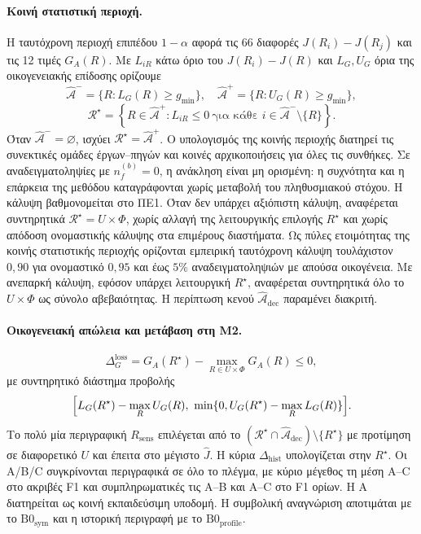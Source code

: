 \documentclass[11pt,a4paper]{article}
\begin{document}
\paragraph{Κοινή στατιστική περιοχή.}
Η ταυτόχρονη περιοχή επιπέδου $1-\alpha$ αφορά τις 66 διαφορές $J(R_i)-J(R_j)$ και τις 12 τιμές $G_A(R)$. Με $L_{iR}$ κάτω όριο του $J(R_i)-J(R)$ και $L_G,U_G$ όρια της οικογενειακής επίδοσης ορίζουμε
\[
\widehat{\mathcal A}^{-}=\{R:L_G(R)\ge g_{\min}\},\quad
\widehat{\mathcal A}^{+}=\{R:U_G(R)\ge g_{\min}\},
\]
\[
\mathcal R^\star=\left\{R\in\widehat{\mathcal A}^{+}:
L_{iR}\le0\ \text{για κάθε }i\in\widehat{\mathcal A}^{-}\setminus\{R\}\right\}.
\]
Όταν $\widehat{\mathcal A}^{-}=\varnothing$, ισχύει $\mathcal R^\star=\widehat{\mathcal A}^{+}$. Ο υπολογισμός της κοινής περιοχής διατηρεί τις συνεκτικές ομάδες έργων--πηγών και κοινές αρχικοποιήσεις για όλες τις συνθήκες. Σε αναδειγματοληψίες με $n_f^{(b)}=0$, η ανάκληση είναι μη ορισμένη: η συχνότητα και η επάρκεια της μεθόδου καταγράφονται χωρίς μεταβολή του πληθυσμιακού στόχου. Η κάλυψη βαθμονομείται στο ΠΕ1. Όταν δεν υπάρχει αξιόπιστη κάλυψη, αναφέρεται συντηρητικά $\mathcal R^\star=U\times\Phi$, χωρίς αλλαγή της λειτουργικής επιλογής $R^\star$ και χωρίς απόδοση ονομαστικής κάλυψης στα επιμέρους διαστήματα.
Ως πύλες ετοιμότητας της κοινής στατιστικής περιοχής ορίζονται εμπειρική ταυτόχρονη κάλυψη τουλάχιστον $0{,}90$ για ονομαστικό $0{,}95$ και έως $5\%$ αναδειγματοληψιών με απούσα οικογένεια. Με ανεπαρκή κάλυψη, εφόσον υπάρχει λειτουργική $R^\star$, αναφέρεται συντηρητικά όλο το $U\times\Phi$ ως σύνολο αβεβαιότητας. Η περίπτωση κενού $\widehat{\mathcal A}_{\mathrm{dec}}$ παραμένει διακριτή.

\paragraph{Οικογενειακή απώλεια και μετάβαση στη Μ2.}
\[
\Delta_G^{\mathrm{loss}}=G_A(R^\star)-\max_{R\in U\times\Phi}G_A(R)\le0,
\]
με συντηρητικό διάστημα προβολής
\[
\Bigl[L_G(R^\star)-\max_RU_G(R),\
\min\{0,U_G(R^\star)-\max_RL_G(R)\}\Bigr].
\]
Το πολύ μία περιγραφική $R_{\mathrm{sens}}$ επιλέγεται από το
$(\mathcal R^\star\cap\widehat{\mathcal A}_{\mathrm{dec}})\setminus\{R^\star\}$ με προτίμηση σε διαφορετικό $U$ και έπειτα στο μέγιστο $\widehat J$. Η κύρια $\Delta_{\mathrm{hist}}$ υπολογίζεται στην $R^\star$. Οι A/B/C συγκρίνονται περιγραφικά σε όλο το πλέγμα, με κύριο μέγεθος τη μέση A--C στο ακριβές F1 και συμπληρωματικές τις A--B και A--C στο F1 ορίων. Η A διατηρείται ως κοινή εκπαιδεύσιμη υποδομή. Η συμβολική αναγνώριση αποτιμάται με το $\mathrm{B0}_{\mathrm{sym}}$ και η ιστορική περιγραφή με το $\mathrm{B0}_{\mathrm{profile}}$.
\end{document}
